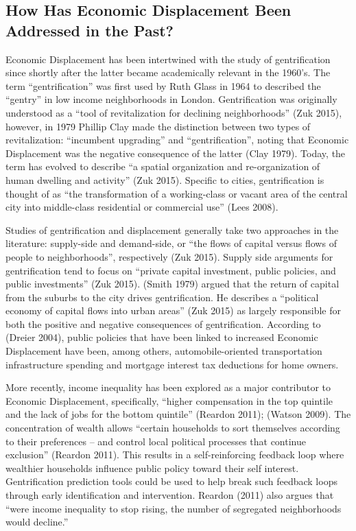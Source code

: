 \documentclass[]{article}
\begin{document}
\subsection{How Has Economic Displacement Been Addressed in the
Past?}\label{how-has-economic-displacement-been-addressed-in-the-past}

Economic Displacement has been intertwined with the study of
gentrification since shortly after the latter became academically
relevant in the 1960's. The term ``gentrification'' was first used by
Ruth Glass in 1964 to described the ``gentry'' in low income
neighborhoods in London. Gentrification was originally understood as a
``tool of revitalization for declining neighborhoods'' (Zuk 2015),
however, in 1979 Phillip Clay made the distinction between two types of
revitalization: ``incumbent upgrading'' and ``gentrification'', noting
that Economic Displacement was the negative consequence of the latter
(Clay 1979). Today, the term has evolved to describe ``a spatial
organization and re-organization of human dwelling and activity'' (Zuk
2015). Specific to cities, gentrification is thought of as ``the
transformation of a working-class or vacant area of the central city
into middle-class residential or commercial use'' (Lees 2008).

Studies of gentrification and displacement generally take two approaches
in the literature: supply-side and demand-side, or ``the flows of
capital versus flows of people to neighborhoods'', respectively (Zuk
2015). Supply side arguments for gentrification tend to focus on
``private capital investment, public policies, and public investments''
(Zuk 2015). (Smith 1979) argued that the return of capital from the
suburbs to the city drives gentrification. He describes a ``political
economy of capital flows into urban areas'' (Zuk 2015) as largely
responsible for both the positive and negative consequences of
gentrification. According to (Dreier 2004), public policies that have
been linked to increased Economic Displacement have been, among others,
automobile-oriented transportation infrastructure spending and mortgage
interest tax deductions for home owners.

More recently, income inequality has been explored as a major
contributor to Economic Displacement, specifically, ``higher
compensation in the top quintile and the lack of jobs for the bottom
quintile'' (Reardon 2011); (Watson 2009). The concentration of wealth
allows ``certain households to sort themselves according to their
preferences -- and control local political processes that continue
exclusion'' (Reardon 2011). This results in a self-reinforcing feedback
loop where wealthier households influence public policy toward their
self interest. Gentrification prediction tools could be used to help
break such feedback loops through early identification and intervention.
Reardon (2011) also argues that ``were income inequality to stop rising,
the number of segregated neighborhoods would decline.''
\end{document}
